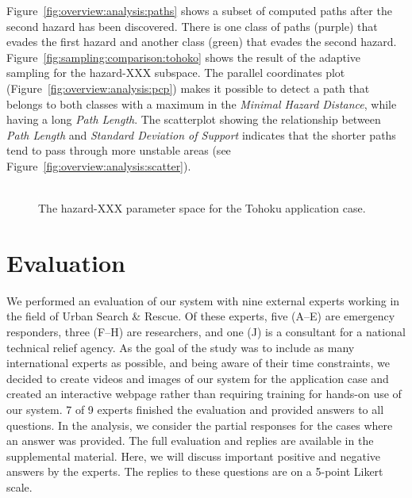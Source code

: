\documentclass{egpubl}
\begin{document}
Figure~\ref{fig:overview:analysis:paths} shows a subset of computed paths after the second hazard has been discovered. There is one class of paths (purple) that evades the first hazard and another class (green) that evades the second hazard. Figure~\ref{fig:sampling:comparison:tohoko} shows the result of the adaptive sampling for the hazard-XXX subspace. The parallel coordinates plot (Figure~\ref{fig:overview:analysis:pcp}) makes it possible to detect a path that belongs to both classes with a maximum in the \emph{Minimal Hazard Distance}, while having a long \emph{Path Length}. The scatterplot showing the relationship between \emph{Path Length} and \emph{Standard Deviation of Support} indicates that the shorter paths tend to pass through more unstable areas (see Figure~\ref{fig:overview:analysis:scatter}).

\begin{figure}
	\newcommand{\abImageComparisonWidth}{0.4\linewidth}
	\centering
		\includegraphics[width=\abImageComparisonWidth]{figures/empty.png}
	\caption{The hazard-XXX parameter space for the Tohoku application case.}
	\label{comparison}
\end{figure}


\section{Evaluation} \label{sec:evaluation}
We performed an evaluation of our system with nine external experts working in the field of Urban Search \& Rescue. Of these experts, five (A--E) are emergency responders, three (F--H) are researchers, and one (J) is a consultant for a national technical relief agency. As the goal of the study was to include as many international experts as possible, and being aware of their time constraints, we decided to create videos and images of our system for the application case and created an interactive webpage rather than requiring training for hands-on use of our system. 7 of 9 experts finished the evaluation and provided answers to all questions. In the analysis, we consider the partial responses for the cases where an answer was provided. The full evaluation and replies are available in the supplemental material. Here, we will discuss important positive and negative answers by the experts. The replies to these questions are on a 5-point Likert scale.
\end{document}
